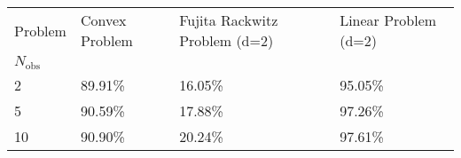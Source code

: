\begin{tabular}{llll}
Problem & Convex Problem & Fujita Rackwitz Problem (d=2) & Linear Problem (d=2) \\
$N_{{ \text{{obs}} }}$ &  &  &  \\
2 & 89.91\% & 16.05\% & 95.05\% \\
\cline{1-4}
5 & 90.59\% & 17.88\% & 97.26\% \\
\cline{1-4}
10 & 90.90\% & 20.24\% & 97.61\% \\
\cline{1-4}
\end{tabular}
